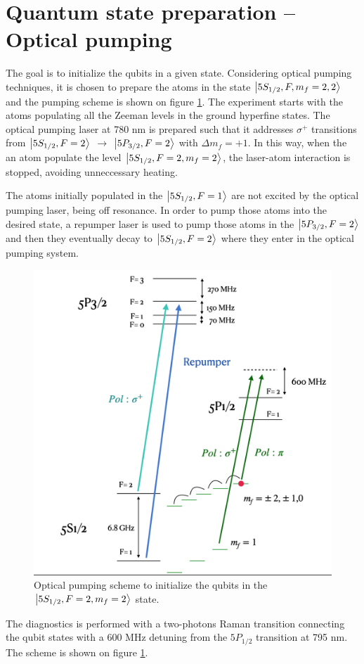 \documentclass[
10pt, %
a4paper, %
oneside, %
headinclude,footinclude, %
BCOR5mm, %
]{scrartcl}
\begin{document}
\clearpage
\newpage

\section{Quantum state preparation -- Optical pumping}

The goal is to initialize the qubits in a given state. Considering optical pumping techniques, it is chosen to prepare the atoms in the state $\ket{5S_{1/2}, F,m_{f} = 2,2}$ and the pumping scheme is shown on figure \ref{OpticalPumping}. The experiment starts with the atoms populating all the Zeeman levels in the ground hyperfine states. The optical pumping laser at 780 nm is prepared such that it addresses $\sigma^{+}$ transitions from $\ket{5S_{1/2}, F=2}$ $\rightarrow$ $\ket{5P_{3/2}, F=2}$ with $\Delta m_{f} = +1$. In this way, when the an atom populate the level $\ket{5S_{1/2}, F=2, m_{f}=2}$, the laser-atom interaction is stopped, avoiding unneccessary heating. 

The atoms initially populated in the $\ket{5S_{1/2}, F=1}$ are not excited by the optical pumping laser, being off resonance. In order to pump those atoms into the desired state, a repumper laser is used to pump those atoms in the $\ket{5P_{3/2}, F=2}$ and then they eventually decay to $\ket{5S_{1/2}, F=2}$ where they enter in the optical pumping system. 

\begin{figure}[t]
    \includegraphics[width=0.8\linewidth]{OpticalPumpingScheme}
    \centering
    \caption{Optical pumping scheme to initialize the qubits in the $\ket{5S_{1/2}, F=2, m_{f}=2}$ state.}
    \label{OpticalPumping}
\end{figure}

The diagnostics is performed with a two-photons Raman transition connecting the qubit states with a 600 MHz detuning from the $5P_{1/2}$ transition at 795 nm. The scheme is shown on figure \ref{OpticalPumping}.
\end{document}
